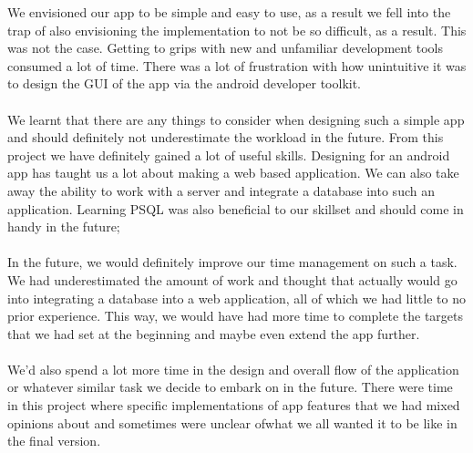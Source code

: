 \documentclass[a4paper,11pt]{article}
\begin{document}
We envisioned our app to be simple and easy to use, as a result we fell into the trap of also envisioning the implementation to not be so difficult, as a result. This was not the case. Getting to grips with new and unfamiliar development tools consumed a lot of time. There was a lot of frustration with how unintuitive it was to design the GUI of the app via the android developer toolkit.
\\
\\ We learnt that there are any things to consider when designing such a simple app and should definitely not underestimate the workload in the future. 
From this project we have definitely gained a lot of useful skills. Designing for an android app has taught us a lot about making a web based application. We can also take away the ability to work with a server and integrate a database into such an application. Learning PSQL was also beneficial to our skillset and should come in handy in the future; 
\\
\\In the future, we would definitely improve our time management on such a task. We had underestimated the amount of work and thought that actually would go into integrating a database into a web application, all of which we had little to no prior experience.
This way, we would have had more time to complete the targets that we had set at the beginning and maybe even extend the app further.
\\
\\ 
We'd also spend a lot more time in the design and overall flow of the application or whatever similar task we decide to embark on in the future. There were time in this project where specific implementations of app features that we had mixed opinions about and sometimes were unclear ofwhat we all wanted it to be like in the final version.
\end{document}
